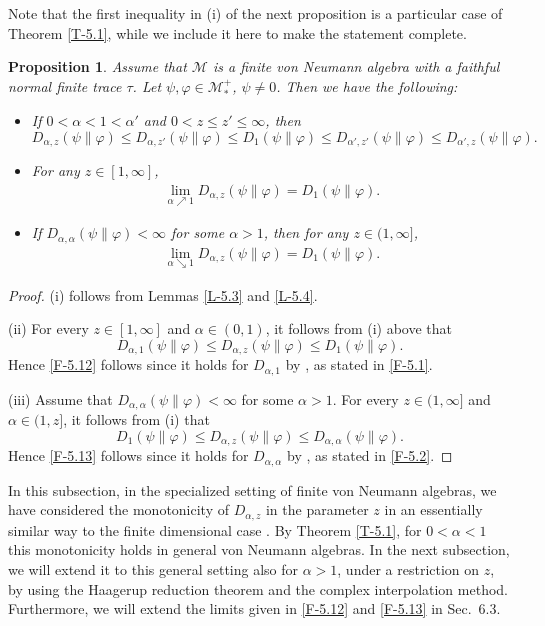 \documentclass[12pt]{article}
\newtheorem{prop}[theorem]{Proposition}
\theoremstyle{definition}
\theoremstyle{remark}
\numberwithin{equation}{section}
\def\Me{\mathcal M}
\def\ffi{\varphi}
\begin{document}
Note that the first inequality in (i) of the next proposition is a particular case of
Theorem \ref{T-5.1}, while we include it here to make the statement complete.

\begin{prop}\label{P-5.5}
Assume that $\Me$ is a finite von Neumann algebra with a faithful normal finite trace $\tau$.
Let $\psi,\ffi\in\Me_*^+$, $\psi\ne0$. Then we have the following:
\begin{itemize}
\item[(i)] If $0<\alpha<1<\alpha'$ and $0<z\le z'\le\infty$, then
\[
D_{\alpha,z}(\psi\|\ffi)\le D_{\alpha,z'}(\psi\|\ffi)\le D_1(\psi\|\ffi)
\le D_{\alpha',z'}(\psi\|\ffi)\le D_{\alpha',z}(\psi\|\ffi).
\]
\item[(ii)] For any $z\in[1,\infty]$,
\begin{align}\label{F-5.12}
\lim_{\alpha\nearrow1}D_{\alpha,z}(\psi\|\ffi)=D_1(\psi\|\ffi).
\end{align}
\item[(iii)] If $D_{\alpha,\alpha}(\psi\|\ffi)<\infty$ for some $\alpha>1$, then for any $z\in(1,\infty]$,
\begin{align}\label{F-5.13}
\lim_{\alpha\searrow1}D_{\alpha,z}(\psi\|\ffi)=D_1(\psi\|\ffi).
\end{align}
\end{itemize}
\end{prop}

\begin{proof}
(i) follows from Lemmas \ref{L-5.3} and \ref{L-5.4}.

(ii)\enspace
For every $z\in[1,\infty]$ and $\alpha\in(0,1)$, it follows from (i) above that
\[
D_{\alpha,1}(\psi\|\ffi)\le D_{\alpha,z}(\psi\|\ffi)\le D_1(\psi\|\ffi).
\]
Hence \eqref{F-5.12} follows since it holds for $D_{\alpha,1}$ by
\cite[Proposition 5.3(3)]{hiai2018quantum}, as stated in \eqref{F-5.1}.

(iii)\enspace
Assume that $D_{\alpha,\alpha}(\psi\|\ffi)<\infty$ for some $\alpha>1$. For every $z\in(1,\infty]$
and $\alpha\in(1,z]$, it follows from (i) that
\[
D_1(\psi\|\ffi)\le D_{\alpha,z}(\psi\|\ffi)\le D_{\alpha,\alpha}(\psi\|\ffi).
\]
Hence \eqref{F-5.13} follows since it holds for $D_{\alpha,\alpha}$ by
\cite[Proposition 3.8(ii)]{jencova2018renyi}, as stated in \eqref{F-5.2}.
\end{proof}

In this subsection, in the specialized setting of finite von Neumann algebras, we have considered the
monotonicity of $D_{\alpha,z}$ in the parameter $z$ in an essentially similar way to the finite dimensional
case \cite{lin2015investigating,mosonyi2023somecontinuity}. By Theorem
\ref{T-5.1}, for $0<\alpha<1$ this monotonicity holds in general von Neumann algebras. In the next
subsection, we will extend it to this general setting also for $\alpha>1$, under a
restriction on $z$, by using the Haagerup reduction theorem and the complex interpolation method. Furthermore,
we will extend the limits given in \eqref{F-5.12} and \eqref{F-5.13} in {\color{red}Sec.~6.3.}
\end{document}
